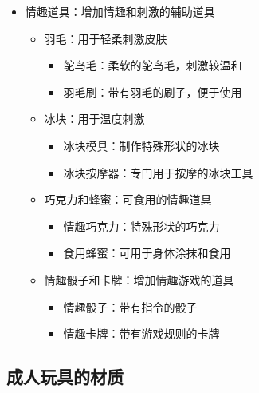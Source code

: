 \documentclass[12pt,UTF8]{ctexbook}
\begin{document}
\begin{itemize}
\begin{itemize}
\begin{itemize}
\begin{itemize}
				\item 基础按摩油：标准的按摩油配方
				\item 情趣按摩油：添加情趣成分的按摩油
				\item 可食用按摩油：可食用的按摩油，增加情趣
			\end{itemize}
			\item 按摩蜡烛：可融化成按摩油的蜡烛
			\begin{itemize}
				\item 低温蜡烛：融化温度较低，安全度高
				\item 香薰蜡烛：带有香气的设计
			\end{itemize}
		\end{itemize}
		\item 情趣道具：增加情趣和刺激的辅助道具
		\begin{itemize}
			\item 羽毛：用于轻柔刺激皮肤
			\begin{itemize}
				\item 鸵鸟毛：柔软的鸵鸟毛，刺激较温和
				\item 羽毛刷：带有羽毛的刷子，便于使用
			\end{itemize}
			\item 冰块：用于温度刺激
			\begin{itemize}
				\item 冰块模具：制作特殊形状的冰块
				\item 冰块按摩器：专门用于按摩的冰块工具
			\end{itemize}
			\item 巧克力和蜂蜜：可食用的情趣道具
			\begin{itemize}
				\item 情趣巧克力：特殊形状的巧克力
				\item 食用蜂蜜：可用于身体涂抹和食用
			\end{itemize}
			\item 情趣骰子和卡牌：增加情趣游戏的道具
			\begin{itemize}
				\item 情趣骰子：带有指令的骰子
				\item 情趣卡牌：带有游戏规则的卡牌
			\end{itemize}
		\end{itemize}
	\end{itemize}
\end{itemize}

\subsection{成人玩具的材质}
\end{document}
